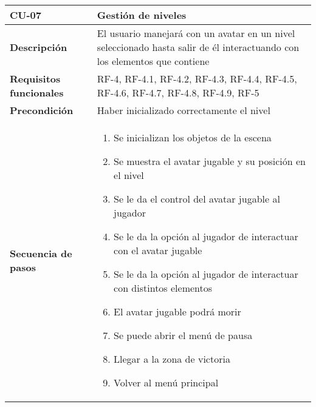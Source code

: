 \begin{longtable}{l|l}
\begin{minipage}{0.25\columnwidth}
\textbf{CU-07} 
\end{minipage}
&
\begin{minipage}{0.65\columnwidth}
Gestión de niveles
\end{minipage}
\\ \hline

\begin{minipage}{0.25\columnwidth}
\textbf{Descripción} 
\end{minipage}
&
\begin{minipage}{0.65\columnwidth}
El usuario manejará con un avatar en un nivel seleccionado hasta salir de él interactuando con los elementos que contiene
\end{minipage}
\\ \hline

\begin{minipage}{0.25\columnwidth}
\textbf{Requisitos funcionales} 
\end{minipage}
&
\begin{minipage}{0.65\columnwidth}
RF-4, RF-4.1, RF-4.2, RF-4.3, RF-4.4, RF-4.5, RF-4.6, RF-4.7, RF-4.8, RF-4.9, RF-5
\end{minipage}
\\ \hline

\begin{minipage}{0.25\columnwidth}
\textbf{Precondición} 
\end{minipage}
&
\begin{minipage}{0.65\columnwidth}
Haber inicializado correctamente el nivel
\end{minipage}
\\ \hline

\begin{minipage}{0.25\columnwidth}
\textbf{Secuencia de pasos} 
\end{minipage}
&
\begin{minipage}{0.65\columnwidth}
\begin{enumerate}
\item
Se inicializan los objetos de la escena
\item
Se muestra el avatar jugable y su posición en el nivel
\item
Se le da el control del avatar jugable al jugador
\item
Se le da la opción al jugador de interactuar con el avatar jugable
\item
Se le da la opción al jugador de interactuar con distintos elementos
\item
El avatar jugable podrá morir
\item
Se puede abrir el menú de pausa
\item
Llegar a la zona de victoria
\item
Volver al menú principal
\end{enumerate}
\end{minipage}
\\ \hline


\end{longtable}

